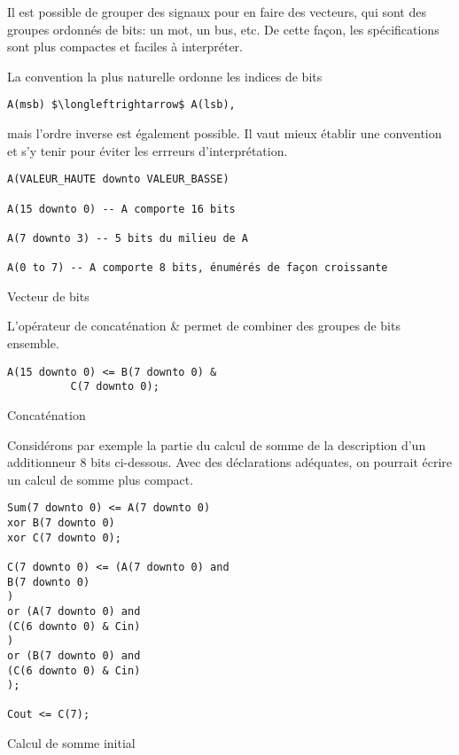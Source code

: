 \documentclass[11pt]{article}
\begin{document}
Il est possible de grouper des signaux pour en faire des vecteurs, qui
sont des groupes ordonnés de bits: un mot, un bus, etc. De cette
façon, les spécifications sont plus compactes et faciles à
interpréter.

La convention la plus naturelle ordonne les indices de bits 
\begin{verbatim}
A(msb) $\longleftrightarrow$ A(lsb),
\end{verbatim}

mais l'ordre inverse est également possible. Il vaut mieux établir une
convention et s'y tenir pour éviter les errreurs d'interprétation.

\begin{listing}[htbp]
\begin{verbatim}
A(VALEUR_HAUTE downto VALEUR_BASSE)

A(15 downto 0) -- A comporte 16 bits

A(7 downto 3) -- 5 bits du milieu de A

A(0 to 7) -- A comporte 8 bits, énumérés de façon croissante
\end{verbatim}
\caption{Vecteur de bits}
\end{listing}

L'opérateur de concaténation \& permet de combiner des groupes de bits
ensemble.

\begin{listing}[htbp]
\begin{verbatim}
A(15 downto 0) <= B(7 downto 0) &
		  C(7 downto 0);
\end{verbatim}
\caption{Concaténation}
\end{listing}

Considérons par exemple la partie du calcul de somme de la description
d'un additionneur 8 bits ci-dessous.  Avec des déclarations adéquates,
on pourrait écrire un calcul de somme plus compact.

\begin{listing}[htbp]
\begin{verbatim}
Sum(7 downto 0) <= A(7 downto 0)
xor B(7 downto 0)
xor C(7 downto 0);

C(7 downto 0) <= (A(7 downto 0) and
B(7 downto 0)
)
or (A(7 downto 0) and
(C(6 downto 0) & Cin)
)
or (B(7 downto 0) and
(C(6 downto 0) & Cin)
);

Cout <= C(7);
\end{verbatim}
\caption{Calcul de somme initial}
\end{listing}
\end{document}
